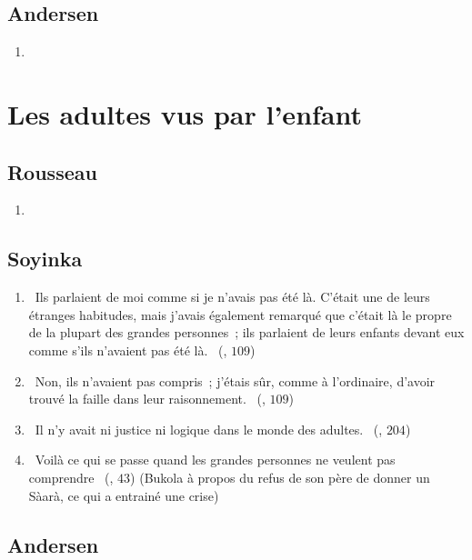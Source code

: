 \documentclass[a4paper, 11pt, hidelinks]{article}
\newcommand{\rb}[1]{\Romanbar{#1}}
\begin{document}
\subsection{Andersen}


\begin{enumerate}
    \item 
\end{enumerate}

\section{Les adultes vus par l’enfant}




\subsection{Rousseau}

\begin{enumerate}
    \item 
\end{enumerate}


\subsection{Soyinka}


\begin{enumerate}
    \item \og{} Ils parlaient de moi comme si je n’avais pas été là. C’était une de leurs étranges habitudes, mais j’avais également remarqué que c’était là le propre de la plupart des grandes personnes ; ils parlaient de leurs enfants devant eux comme s’ils n’avaient pas été là. \fg{} (\rb{4}, $109$)
    \item \og{} Non, ils n’avaient pas compris ; j’étais sûr, comme à l’ordinaire, d’avoir trouvé la faille dans leur raisonnement. \fg{} (\rb{4}, $109$)
    \item \og{} Il n’y avait ni justice ni logique dans le monde des adultes. \fg{} (\rb{7}, $204$)
    \item \og{} Voilà ce qui se passe quand les grandes personnes ne veulent pas comprendre \fg{} (\rb{1}, $43$) (Bukola à propos du refus de son père de donner un Sàarà, ce qui a entrainé une crise)
    
\end{enumerate}


\subsection{Andersen}
\end{document}
